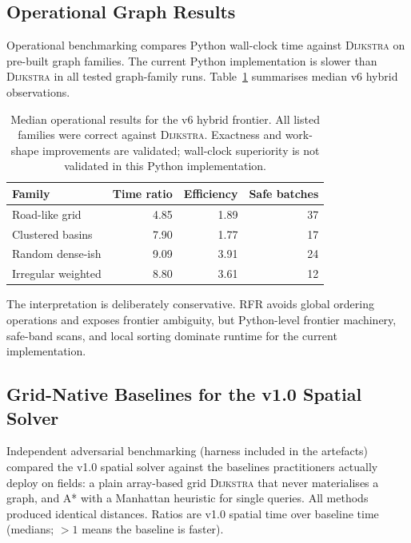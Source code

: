 \documentclass[11pt]{article}
\newcommand{\RFR}{\textsc{RFR}}
\newcommand{\Dijkstra}{\textsc{Dijkstra}}
\begin{document}
\subsection{Operational Graph Results}

Operational benchmarking compares Python wall-clock time against \Dijkstra{} on pre-built graph families. The current Python implementation is slower than \Dijkstra{} in all tested graph-family runs. Table~\ref{tab:operational} summarises median v6 hybrid observations.

\begin{table}[htbp]
\centering
\begin{tabular}{lrrr}
\toprule
Family & Time ratio & Efficiency & Safe batches \\
\midrule
Road-like grid & 4.85 & 1.89 & 37 \\
Clustered basins & 7.90 & 1.77 & 17 \\
Random dense-ish & 9.09 & 3.91 & 24 \\
Irregular weighted & 8.80 & 3.61 & 12 \\
\bottomrule
\end{tabular}
\caption{Median operational results for the v6 hybrid frontier. All listed families were correct against \Dijkstra{}. Exactness and work-shape improvements are validated; wall-clock superiority is not validated in this Python implementation.}
\label{tab:operational}
\end{table}

The interpretation is deliberately conservative. \RFR{} avoids global ordering operations and exposes frontier ambiguity, but Python-level frontier machinery, safe-band scans, and local sorting dominate runtime for the current implementation.

\subsection{Grid-Native Baselines for the v1.0 Spatial Solver}
\label{sec:gridnative}

Independent adversarial benchmarking (harness included in the artefacts) compared the v1.0 spatial solver against the baselines practitioners actually deploy on fields: a plain array-based grid \Dijkstra{} that never materialises a graph, and A* with a Manhattan heuristic for single queries. All methods produced identical distances. Ratios are v1.0 spatial time over baseline time (medians; $>1$ means the baseline is faster).
\end{document}
